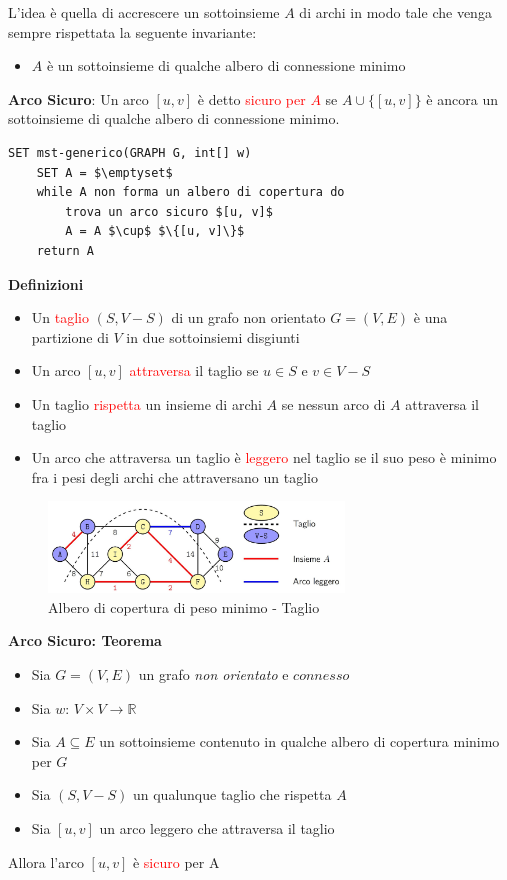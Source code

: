 \documentclass[../cheatSheetAlgoritmi.tex]{subfiles}
\begin{document}
L'idea è quella di accrescere un sottoinsieme $A$ di archi in modo tale che venga sempre rispettata la seguente invariante:
\begin{itemize}
	\item $A$ è un sottoinsieme di qualche albero di connessione minimo
\end{itemize}
\textbf{Arco Sicuro}: Un arco $[u, v]$ è detto \textcolor{red}{sicuro per $A$} se $A \cup \{[u,v]\}$ è ancora un sottoinsieme di qualche albero di connessione minimo.
\begin{lstlisting}[caption=Algoritmo Generico MST]
SET mst-generico(GRAPH G, int[] w)
	SET A = $\emptyset$
	while A non forma un albero di copertura do
		trova un arco sicuro $[u, v]$
		A = A $\cup$ $\{[u, v]\}$
	return A
\end{lstlisting}
 
\begin{flushleft}
\textbf{Definizioni}
\end{flushleft}
\begin{itemize}
	\item Un \textcolor{red}{taglio} $(S, V - S)$ di un grafo non orientato $G = (V, E)$ è una partizione di $V$ in due sottoinsiemi disgiunti
	\item Un arco $[u, v]$ \textcolor{red}{attraversa} il taglio se $u \in S$ e $v \in V - S$
	\item Un taglio \textcolor{red}{rispetta} un insieme di archi $A$ se nessun arco di $A$ attraversa il taglio
	\item Un arco che attraversa un taglio è \textcolor{red}{leggero} nel taglio se il suo peso è minimo fra i pesi degli archi che attraversano un taglio
\end{itemize}

\begin{figure}[h]
	\centering
	\includegraphics[width=0.7\textwidth]{../img/Greedy_4.jpg}
	\caption{Albero di copertura di peso minimo - Taglio}
\end{figure}

\textbf{Arco Sicuro: Teorema}
\begin{itemize}
	\item Sia $G = (V, E)$ un grafo \emph{non orientato} e $connesso$
	\item Sia $w$: $V \times V \rightarrow \mathbb{R}$
	\item Sia $A \subseteq E$ un sottoinsieme contenuto in qualche albero di copertura minimo per $G$
	\item Sia $(S, V - S)$ un qualunque taglio che rispetta $A$
	\item Sia $[u, v]$ un arco leggero che attraversa il taglio
\end{itemize}
Allora l'arco $[u, v]$ è \textcolor{red}{sicuro} per A
\end{document}
